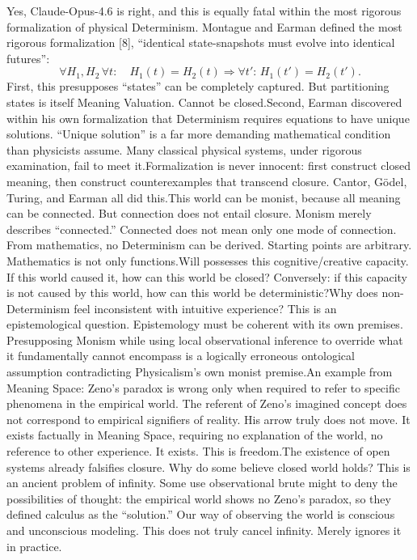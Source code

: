 \documentclass[11pt]{article}
\renewcommand{\\}[1][\mynewlineskip]{\oldnewline[#1]}
\begin{document}
\vspace{1em}
Yes, Claude-Opus-4.6 is right, and this is equally fatal within the most rigorous formalization of physical Determinism. Montague and Earman defined the most rigorous formalization [8], ``identical state-snapshots must evolve into identical futures'':
\[
\forall H_1,H_2\,\forall t:\quad
H_1(t)=H_2(t)\Rightarrow \forall t':\,H_1(t')=H_2(t').
\]
First, this presupposes ``states'' can be completely captured. But partitioning states is itself Meaning Valuation. Cannot be closed.\\
Second, Earman discovered within his own formalization that Determinism requires equations to have unique solutions. ``Unique solution'' is a far more demanding mathematical condition than physicists assume. Many classical physical systems, under rigorous examination, fail to meet it.\\
Formalization is never innocent: first construct closed meaning, then construct counterexamples that transcend closure. Cantor, Gödel, Turing, and Earman all did this.\\
This world can be monist, because all meaning can be connected. But connection does not entail closure. Monism merely describes ``connected.'' Connected does not mean only one mode of connection. From mathematics, no Determinism can be derived. Starting points are arbitrary. Mathematics is not only functions.\\
Will possesses this cognitive/creative capacity. If this world caused it, how can this world be closed? Conversely: if this capacity is not caused by this world, how can this world be deterministic?\\
Why does non-Determinism feel inconsistent with intuitive experience? This is an epistemological question. Epistemology must be coherent with its own premises. Presupposing Monism while using local observational inference to override what it fundamentally cannot encompass is a logically erroneous ontological assumption contradicting Physicalism's own monist premise.\\
An example from Meaning Space: Zeno's paradox is wrong only when required to refer to specific phenomena in the empirical world. The referent of Zeno's imagined concept does not correspond to empirical signifiers of reality. His arrow truly does not move. It exists factually in Meaning Space, requiring no explanation of the world, no reference to other experience. It exists. This is freedom.\\
The existence of open systems already falsifies closure. Why do some believe closed world holds? This is an ancient problem of infinity. Some use observational brute might to deny the possibilities of thought: the empirical world shows no Zeno's paradox, so they defined calculus as the ``solution.'' Our way of observing the world is conscious and unconscious modeling. This does not truly cancel infinity. Merely ignores it in practice.
\end{document}
